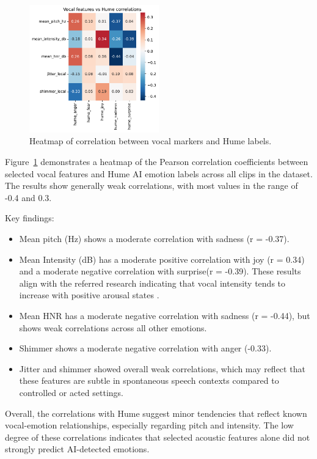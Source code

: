 \begin{figure}[H]
    \centering
    \includegraphics[width=0.5\textwidth]{png/results/rq1/vocal_features_vs_hume_correlations.pdf}
    \caption{Heatmap of correlation between vocal markers and Hume labels.}
    \label{fig:heatmap-voc-hume}
\end{figure}

Figure~\ref{fig:heatmap-voc-hume} demonstrates a heatmap of the Pearson correlation coefficients between selected vocal features and Hume AI emotion labels across all clips in the dataset. The results show generally weak correlations, with most values in the range of -0.4 and 0.3. 

\medskip
Key findings: 
\begin{itemize}
    \item Mean pitch (Hz) shows a moderate correlation with sadness (r = -0.37). 
    \item Mean Intensity (dB) has a moderate positive correlation with joy (r = 0.34) and a moderate negative correlation with surprise(r = -0.39). These results align with the referred research indicating that vocal intensity tends to increase with positive arousal states \autocite{Ekberg2023}. 
    \item Mean HNR has a moderate negative correlation with sadness (r = -0.44), but shows weak correlations across all other emotions.
    \item Shimmer shows a moderate negative correlation with anger (-0.33).
    \item Jitter and shimmer showed overall weak correlations, which may reflect that these features are subtle in spontaneous speech contexts compared to controlled or acted settings.  
\end{itemize}
Overall, the correlations with Hume suggest minor tendencies that reflect known vocal-emotion relationships, especially regarding pitch and intensity. The low degree of these correlations indicates that selected acoustic features alone did not strongly predict AI-detected emotions. 

